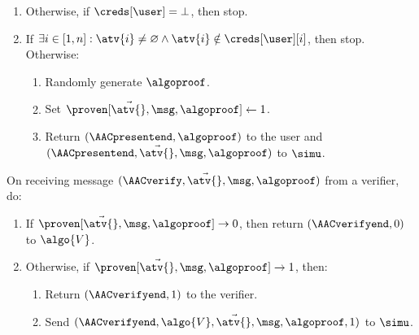 \begin{framed}
\begin{enumerate}
\begin{enumerate}
	      \item Return $(\AACpresentend, \algoproof)$ to the user and
$(\AACpresentend, \vec{\atv{}}, \msg, \allowbreak \algoproof)$ to $\simu$.

	    \end{enumerate}

	  \item Otherwise, if $\creds[\user] = \bot$, then stop.

	  \item If $\exists i \in [1, n]: \atv{i} \neq \varnothing \land \atv{i}
\notin \creds[\user][i]$, then stop. Otherwise:

	    \begin{enumerate}

	      \item Randomly generate $\algoproof$.

	      \item Set $\proven[\vec{\atv{}}, \msg, \algoproof] \leftarrow 1$.

	      \item Return $(\AACpresentend,  \algoproof)$ to the user and
$(\AACpresentend, \vec{\atv{}}, \msg, \allowbreak \algoproof)$ to $\simu$.

	    \end{enumerate}

	\end{enumerate}

	\fuinterface{\AACverify} On receiving message $(\AACverify, \vec{\atv{}},
\allowbreak \msg, \algoproof)$ from a verifier, do:

	\begin{enumerate}

	  \item If $\proven[\vec{\atv{}}, \msg, \algoproof] \rightarrow 0$, then
return $(\AACverifyend, 0)$ to $\algo{V}$.

	  \item Otherwise, if $\proven[\vec{\atv{}}, \msg, \algoproof]
\rightarrow 1$, then:

	    \begin{enumerate}

	      \item Return $(\AACverifyend, 1)$ to the verifier.

	      \item Send $(\AACverifyend, \algo{V}, \vec{\atv{}}, \msg,
\algoproof, \allowbreak 1)$ to $\simu$.

	    \end{enumerate}


\end{enumerate}
\end{framed}
